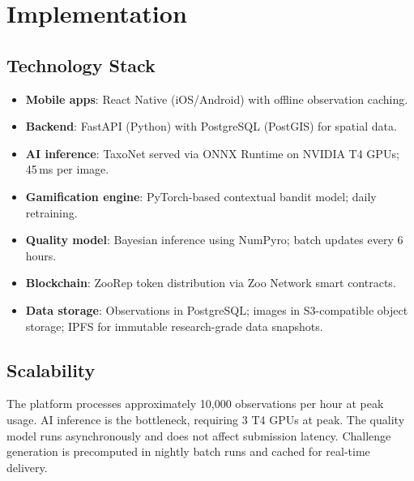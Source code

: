 \section{Implementation}

\label{sec:implementation}

\subsection{Technology Stack}

\begin{itemize}
  \item \textbf{Mobile apps}: React Native (iOS/Android) with offline
    observation caching.
  \item \textbf{Backend}: FastAPI (Python) with PostgreSQL (PostGIS) for
    spatial data.
  \item \textbf{AI inference}: TaxoNet served via ONNX Runtime on
    NVIDIA T4 GPUs; 45\,ms per image.
  \item \textbf{Gamification engine}: PyTorch-based contextual bandit
    model; daily retraining.
  \item \textbf{Quality model}: Bayesian inference using NumPyro;
    batch updates every 6 hours.
  \item \textbf{Blockchain}: ZooRep token distribution via Zoo Network
    smart contracts.
  \item \textbf{Data storage}: Observations in PostgreSQL; images in
    S3-compatible object storage; IPFS for immutable research-grade
    data snapshots.
\end{itemize}

\subsection{Scalability}

The platform processes approximately 10{,}000 observations per hour at
peak usage. AI inference is the bottleneck, requiring 3 T4 GPUs at peak.
The quality model runs asynchronously and does not affect submission
latency. Challenge generation is precomputed in nightly batch runs and
cached for real-time delivery.


